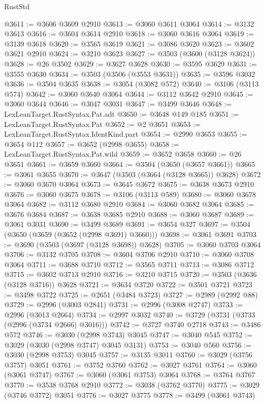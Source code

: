 \begin{lexlean}{RustStd}
\begin{coremodule}
@3611 := @3606 @3609 @2910
@3613 := @3060 @3611 @3064
@3614 := @3132 @3613
@3616 := @3604 @3614 @2910
@3618 := @3060 @3616 @3064
@3619 := @3139 @3618
@3620 := @3565 @3619
@3621 := @3086 @3620
@3623 := @3602 @3621 @2910
@3624 := @3210 @3623
@3627 := @3503 (@3600 (@3128 @3624))
@3628 := @26 @3502
@3629 := @3627 @3628
@3630 := @3595 @3629
@3631 := @3555 @3630
@3634 := @3503 (@3506 (@3553 @3631))
@3635 := @3596 @3032
@3636 := @3504 @3635
@3638 := @3054 (@3082 @572)
@3640 := @3106 (@3113 @574)
@3642 := @3060 @3640 @3064
@3644 := @3112 @3642 @2910
@3645 := @3060 @3644
@3646 := @3047 @3031
@3647 := @3499 @3646
@3648 := LexLeanTarget.RustSyntax.Pat.adt
@3650 := @3648 @149 @185
@3651 := LexLeanTarget.RustSyntax.Pat
@3652 := @2 @3651
@3653 := LexLeanTarget.RustSyntax.IdentKind.part
@3654 := @2990 @3653
@3655 := @3654 @112
@3657 := @3652 (@2998 @3655)
@3658 := LexLeanTarget.RustSyntax.Pat.wild
@3659 := @3652 @3658
@3660 := @26 @3651
@3661 := @3659 @3660
@3664 := @3504 (@3650 (@3657 @3661))
@3665 := @3061 @3655
@3670 := @3647 (@3503 (@3664 (@3128 @3665)) @3628)
@3672 := @3060 @3670 @3064
@3673 := @3645 @3672
@3675 := @3638 @3673 @2910
@3676 := @3060 @3675
@3678 := @3106 (@3113 @589)
@3680 := @3060 @3678 @3064
@3682 := @3112 @3680 @2910
@3684 := @3060 @3682 @3064
@3685 := @3676 @3684
@3687 := @3638 @3685 @2910
@3688 := @3060 @3687
@3689 := @3061 @3031
@3690 := @3499 @3689
@3691 := @3654 @327
@3697 := @3504 (@3650 (@3659 (@3652 (@2998 @3691) @3660)))
@3698 := @3061 @3691
@3703 := @3690 (@3503 (@3697 (@3128 @3698)) @3628)
@3705 := @3060 @3703 @3064
@3706 := @3132 @3705
@3708 := @3604 @3706 @2910
@3710 := @3060 @3708 @3064
@3711 := @3688 @3710
@3712 := @3565 @3711
@3713 := @3086 @3712
@3715 := @3602 @3713 @2910
@3716 := @3210 @3715
@3720 := @3503 (@3636 (@3128 @3716)) @3628
@3721 := @3634 @3720
@3722 := @3501 @3721
@3723 := @3498 @3722
@3725 := @2651 (@3484 @3723)
@3727 := @2989 (@2992 @88)
@3729 := @2996 (@3003 @2841)
@3731 := @2996 (@3008 @2747)
@3733 := @2996 (@3013 @2664)
@3734 := @2997 @3032
@3740 := @3729 (@3731 (@3733 (@2996 (@3734 @2666) @3016)))
@3742 := @3727 @3740 @2718
@3743 := @3486 @572
@3746 := @3030 (@2998 @3743) @3045
@3747 := @3040 @545
@3752 := @3029 (@3030 (@2998 @3747) @3045 @3131)
@3753 := @3040 @560
@3756 := @3030 (@2998 @3753) @3045
@3757 := @3135 @3011
@3760 := @3029 (@3756 @3757) @3051
@3761 := @3752 @3760
@3762 := @3027 @3761
@3764 := @3060 (@3061 @3747)
@3767 := @3060 (@3061 @3753) @3064
@3768 := @3764 @3767
@3770 := @3538 @3768 @2910
@3772 := @3038 (@3762 @3770)
@3775 := @3029 (@3746 @3772) @3051
@3776 := @3027 @3775
@3778 := @3499 (@3061 @3743)

\end{coremodule}
\end{lexlean}
